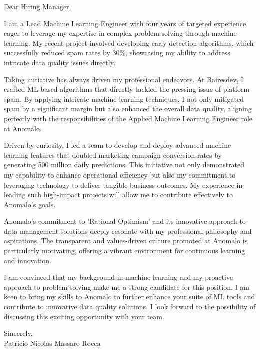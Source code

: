 \documentclass{article}
\begin{document}
\noindent Dear Hiring Manager,


I am a Lead Machine Learning Engineer with four years of targeted experience, eager to leverage my expertise in complex problem-solving through machine learning. My recent project involved developing early detection algorithms, which successfully reduced spam rates by 30\%, showcasing my ability to address intricate data quality issues directly.


Taking initiative has always driven my professional endeavors. At Bairesdev, I crafted ML-based algorithms that directly tackled the pressing issue of platform spam. By applying intricate machine learning techniques, I not only mitigated spam by a significant margin but also enhanced the overall data quality, aligning perfectly with the responsibilities of the Applied Machine Learning Engineer role at Anomalo.


Driven by curiosity, I led a team to develop and deploy advanced machine learning features that doubled marketing campaign conversion rates by generating 500 million daily predictions. This initiative not only demonstrated my capability to enhance operational efficiency but also my commitment to leveraging technology to deliver tangible business outcomes. My experience in leading such high-impact projects will allow me to contribute effectively to Anomalo's goals.


Anomalo's commitment to 'Rational Optimism' and its innovative approach to data management solutions deeply resonate with my professional philosophy and aspirations. The transparent and values-driven culture promoted at Anomalo is particularly motivating, offering a vibrant environment for continuous learning and innovation.


I am convinced that my background in machine learning and my proactive approach to problem-solving make me a strong candidate for this position. I am keen to bring my skills to Anomalo to further enhance your suite of ML tools and contribute to innovative data quality solutions. I look forward to the possibility of discussing this exciting opportunity with your team.

\vspace{1cm}
\setlength{\parskip}{0em}
\begin{flushright}
Sincerely,\\
Patricio Nicolas Massaro Rocca
\end{flushright}
\end{document}
